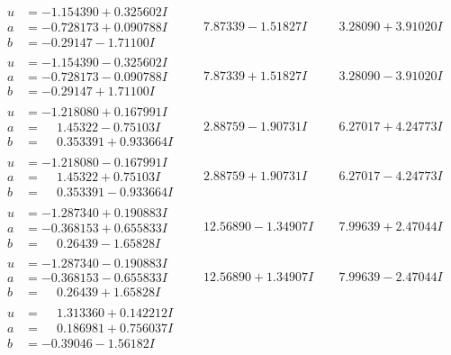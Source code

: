\documentclass[1p]{elsarticle_modified}
\theoremstyle{definition}
\begin{document}
$$\begin{array}{c|c|c}
\begin{aligned}
u &= -1.154390 + 0.325602 I \\
a &= -0.728173 + 0.090788 I \\
b &= -0.29147 - 1.71100 I\end{aligned}
 & \phantom{-}7.87339 - 1.51827 I & \phantom{-}3.28090 + 3.91020 I \\ \hline\begin{aligned}
u &= -1.154390 - 0.325602 I \\
a &= -0.728173 - 0.090788 I \\
b &= -0.29147 + 1.71100 I\end{aligned}
 & \phantom{-}7.87339 + 1.51827 I & \phantom{-}3.28090 - 3.91020 I \\ \hline\begin{aligned}
u &= -1.218080 + 0.167991 I \\
a &= \phantom{-}1.45322 - 0.75103 I \\
b &= \phantom{-}0.353391 + 0.933664 I\end{aligned}
 & \phantom{-}2.88759 - 1.90731 I & \phantom{-}6.27017 + 4.24773 I \\ \hline\begin{aligned}
u &= -1.218080 - 0.167991 I \\
a &= \phantom{-}1.45322 + 0.75103 I \\
b &= \phantom{-}0.353391 - 0.933664 I\end{aligned}
 & \phantom{-}2.88759 + 1.90731 I & \phantom{-}6.27017 - 4.24773 I \\ \hline\begin{aligned}
u &= -1.287340 + 0.190883 I \\
a &= -0.368153 + 0.655833 I \\
b &= \phantom{-}0.26439 - 1.65828 I\end{aligned}
 & \phantom{-}12.56890 - 1.34907 I & \phantom{-}7.99639 + 2.47044 I \\ \hline\begin{aligned}
u &= -1.287340 - 0.190883 I \\
a &= -0.368153 - 0.655833 I \\
b &= \phantom{-}0.26439 + 1.65828 I\end{aligned}
 & \phantom{-}12.56890 + 1.34907 I & \phantom{-}7.99639 - 2.47044 I \\ \hline\begin{aligned}
u &= \phantom{-}1.313360 + 0.142212 I \\
a &= \phantom{-}0.186981 + 0.756037 I \\
b &= -0.39046 - 1.56182 I\end{aligned}

\end{array}$$
\end{document}
